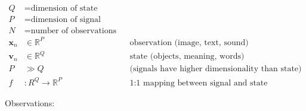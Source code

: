 \documentclass[
  10pt,
  letterpaper,
  DIV=11,
  numbers=noendperiod,
  oneside]{scrartcl}
\newcommand{\bm}[1]{\boldsymbol{#1}}
\begin{document}
\vspace{5cm}


\[\begin{aligned}
   Q &=\text{dimension of state}\\
   P &=\text{dimension of signal}\\
   N &=\text{number of observations}\\
   \bm{x}_n &\in \mathbb{R}^P &&  \text{observation (image, text, sound)}\\
   \bm{v}_n &\in \mathbb{R}^Q && \text{state (objects, meaning, words)}\\
   P &\gg Q && \text{(signals have higher dimensionality than state)}\\
   f&:R^Q\rightarrow \mathbb{R}^P && \text{1:1 mapping between signal and state}
\end{aligned}
\]

Observations:
\end{document}
